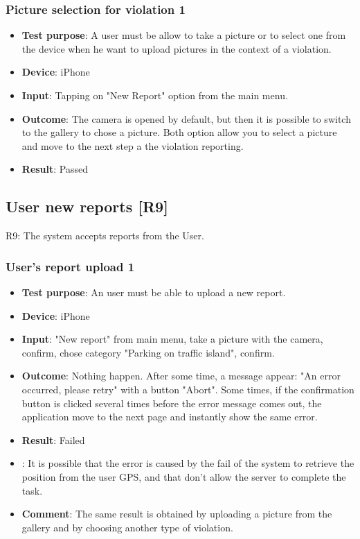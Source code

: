 \documentclass[../ATD.tex]{subfiles}
\begin{document}
    \subsubsection{Picture selection for violation 1}\label{subsubsec:picture-selection-for-violation-1}
    \begin{itemize}
        \item \textbf{Test purpose}: A user must be allow to take a picture or to select one from the device when he want to upload pictures in the context of a violation.
        \item \textbf{Device}: iPhone
        \item \textbf{Input}: Tapping on "New Report" option from the main menu.
        \item \textbf{Outcome}: The camera is opened by default, but then it is possible to switch to the gallery to chose a picture.
        Both option allow you to select a picture and move to the next step a the violation reporting.
        \item \textbf{Result}: Passed
    \end{itemize}

    \subsection{User new reports [R9]}\label{subsec:user-new-report}
    R9: The system accepts reports from the User.

    \subsubsection{User's report upload 1}\label{subsubsec:user-report-upload-1}
    \begin{itemize}
        \item \textbf{Test purpose}: An user must be able to upload a new report.
        \item \textbf{Device}: iPhone
        \item \textbf{Input}: "New report" from main menu, take a picture with the camera, confirm, chose category "Parking on traffic island", confirm.
        \item \textbf{Outcome}: Nothing happen.
        After some time, a message appear: "An error occurred, please retry" with a button "Abort".
        Some times, if the confirmation button is clicked several times before the error message comes out, the application move to the next page and instantly show the same error.
        \item \textbf{Result}: Failed
        \item {}: It is possible that the error is caused by the fail of the system to retrieve the position from the user GPS, and that don't allow the server to complete the task.
        \item \textbf{Comment}: The same result is obtained by uploading a picture from the gallery and by choosing another type of violation.
    \end{itemize}
\end{document}
